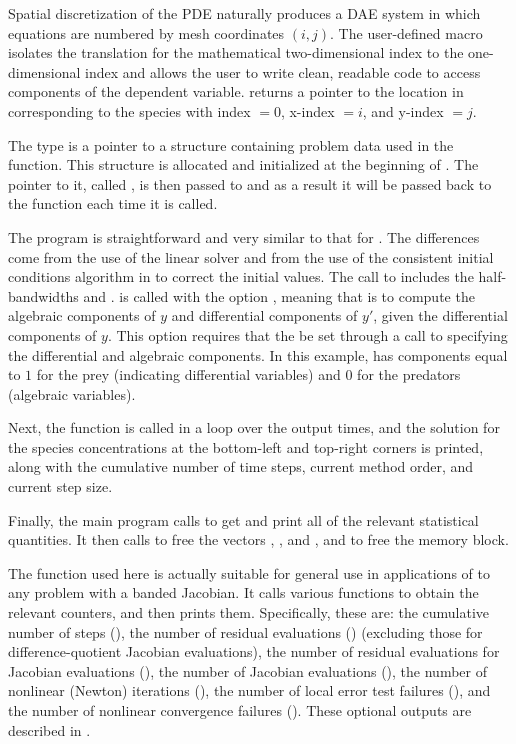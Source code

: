 Spatial discretization of the PDE naturally produces a DAE system in
which equations are numbered by mesh coordinates $(i,j)$. The
user-defined macro  isolates the translation for the
mathematical two-dimensional index to the one-dimensional
 index and allows the user to write clean, readable code
to access components of the dependent variable. 
returns a pointer to the location in  corresponding to the species
with index  $= 0$, x-index  $= i$, and y-index  $= j$.

The type  is a pointer to a structure containing problem
data used in the  function.  This structure is
allocated and initialized at the beginning of . The pointer
to it, called , is then passed to  and as a result 
it will be passed back to the  function each time it is called.

The  program is straightforward and very similar to that for .
The differences come from the use of the {\sunlinsolband} linear solver and from the
use of the consistent initial conditions algorithm in {\ida} to correct the initial
values. The call to  includes the half-bandwidths  and .
 is called with the option , meaning
that {\ida} is to compute the algebraic components of $y$ and differential  
components of $y'$, given the differential components of $y$.  
This option requires that the   be set through a call to 
 specifying the differential and algebraic components. In this example,
 has components equal to $1$ for the prey (indicating differential 
variables) and $0$ for the predators (algebraic variables).

Next, the  function is called in a loop over the output times,
and the solution for the species concentrations at the bottom-left and
top-right corners is printed, along with the cumulative number of time
steps, current method order, and current step size.

Finally, the main program calls  to get and print
all of the relevant statistical quantities.  It then calls 
to free the vectors , , and , and  to free the 
{\ida} memory block.

The function  used here is actually suitable for
general use in applications of {\ida} to any problem with a banded
Jacobian.  It calls various  
functions to obtain the relevant counters, and then prints them.
Specifically, these are: the cumulative number of steps (), 
the number of residual evaluations () (excluding those for
difference-quotient Jacobian evaluations),
the number of residual evaluations for Jacobian evaluations (),
the number of Jacobian evaluations (),
the number of nonlinear (Newton) iterations (),
the number of local error test failures (),
and the number of nonlinear convergence failures ().
These optional outputs are described in .

